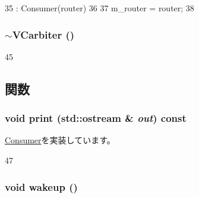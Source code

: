 \begin{DoxyCode}
35     : Consumer(router)
36 {
37     m_router = router;
38 }
\end{DoxyCode}
\hypertarget{classVCarbiter_afafb5cfdbc21827fa86927218f39b6c0}{
\subsubsection[{$\sim$VCarbiter}]{\setlength{\rightskip}{0pt plus 5cm}$\sim${\bf VCarbiter} ()}}
\label{classVCarbiter_afafb5cfdbc21827fa86927218f39b6c0}



\begin{DoxyCode}
45 {}
\end{DoxyCode}


\subsection{関数}
\hypertarget{classVCarbiter_ac55fe386a101fbae38c716067c9966a0}{
\subsubsection[{print}]{\setlength{\rightskip}{0pt plus 5cm}void print (std::ostream \& {\em out}) const}}
\label{classVCarbiter_ac55fe386a101fbae38c716067c9966a0}


\hyperlink{classConsumer_a3ea5f7af5db62cc24f4e40df9ea5c971}{Consumer}を実装しています。


\begin{DoxyCode}
47 {}
\end{DoxyCode}
\hypertarget{classVCarbiter_ae674290a26ecbd622c5160e38e8a4fe9}{
\subsubsection[{wakeup}]{\setlength{\rightskip}{0pt plus 5cm}void wakeup ()}}
\label{classVCarbiter_ae674290a26ecbd622c5160e38e8a4fe9}



